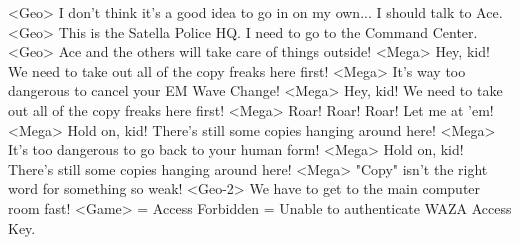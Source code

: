 <Geo> I don't think it's a good idea to go in on my own... I should talk to Ace. 
<Geo> This is the Satella Police HQ. I need to go to the Command Center. 
<Geo> Ace and the others will take care of things outside! 
<Mega> Hey, kid! We need to take out all of the copy freaks here first! 
<Mega> It's way too dangerous to cancel your EM Wave Change! 
<Mega> Hey, kid! We need to take out all of the copy freaks here first! 
<Mega> Roar! Roar! Roar! Let me at 'em! 
<Mega> Hold on, kid! There's still some copies hanging around here! 
<Mega> It's too dangerous to go back to your human form! 
<Mega> Hold on, kid! There's still some copies hanging around here! 
<Mega> "Copy" isn't the right word for something so weak! 
<Geo-2> We have to get to the main computer room fast! 
<Game> = Access Forbidden = Unable to authenticate WAZA Access Key. 
